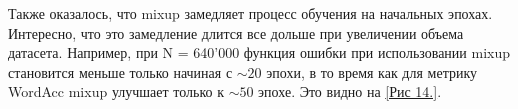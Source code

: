Также оказалось, что mixup замедляет процесс обучения на начальных эпохах. Интересно, что это замедление длится все дольше при увеличении объема датасета. Например, при N = 640'000 функция ошибки при использовании mixup становится меньше только начиная с $\sim 20$ эпохи, в то время как для метрику WordAcc mixup улучшает только к $\sim 50$ эпохе. Это видно на \hyperlink{image14}{[Рис 14.]}.
\newpage
